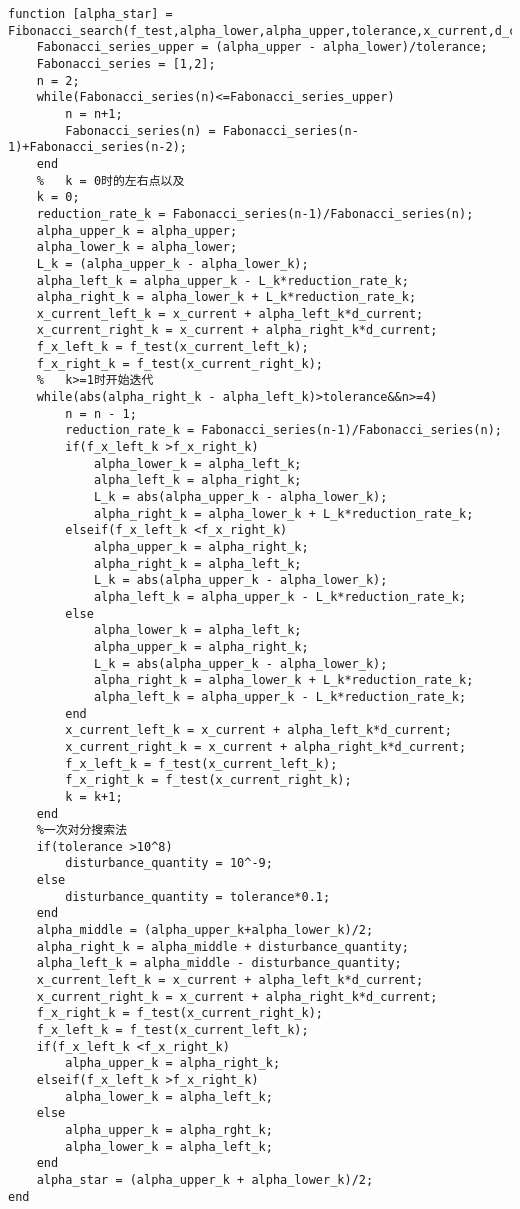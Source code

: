 \newpage
\begin{lstlisting}[style=matlab, title="斐波那契方法代码"]
function [alpha_star] = Fibonacci_search(f_test,alpha_lower,alpha_upper,tolerance,x_current,d_current)
    Fabonacci_series_upper = (alpha_upper - alpha_lower)/tolerance;
    Fabonacci_series = [1,2];
    n = 2;
    while(Fabonacci_series(n)<=Fabonacci_series_upper)
        n = n+1;
        Fabonacci_series(n) = Fabonacci_series(n-1)+Fabonacci_series(n-2);
    end
    %   k = 0时的左右点以及
    k = 0;
    reduction_rate_k = Fabonacci_series(n-1)/Fabonacci_series(n);
    alpha_upper_k = alpha_upper;
    alpha_lower_k = alpha_lower;
    L_k = (alpha_upper_k - alpha_lower_k);
    alpha_left_k = alpha_upper_k - L_k*reduction_rate_k;
    alpha_right_k = alpha_lower_k + L_k*reduction_rate_k;
    x_current_left_k = x_current + alpha_left_k*d_current;
    x_current_right_k = x_current + alpha_right_k*d_current;
    f_x_left_k = f_test(x_current_left_k);
    f_x_right_k = f_test(x_current_right_k);
    %   k>=1时开始迭代
    while(abs(alpha_right_k - alpha_left_k)>tolerance&&n>=4)
        n = n - 1;
        reduction_rate_k = Fabonacci_series(n-1)/Fabonacci_series(n);
        if(f_x_left_k >f_x_right_k)
            alpha_lower_k = alpha_left_k;
            alpha_left_k = alpha_right_k;
            L_k = abs(alpha_upper_k - alpha_lower_k);
            alpha_right_k = alpha_lower_k + L_k*reduction_rate_k;
        elseif(f_x_left_k <f_x_right_k)
            alpha_upper_k = alpha_right_k;
            alpha_right_k = alpha_left_k;
            L_k = abs(alpha_upper_k - alpha_lower_k);
            alpha_left_k = alpha_upper_k - L_k*reduction_rate_k;
        else
            alpha_lower_k = alpha_left_k;
            alpha_upper_k = alpha_right_k;
            L_k = abs(alpha_upper_k - alpha_lower_k);
            alpha_right_k = alpha_lower_k + L_k*reduction_rate_k;
            alpha_left_k = alpha_upper_k - L_k*reduction_rate_k;
        end
        x_current_left_k = x_current + alpha_left_k*d_current;
        x_current_right_k = x_current + alpha_right_k*d_current;
        f_x_left_k = f_test(x_current_left_k);
        f_x_right_k = f_test(x_current_right_k);
        k = k+1;
    end
    %一次对分搜索法
    if(tolerance >10^8)
        disturbance_quantity = 10^-9;
    else
        disturbance_quantity = tolerance*0.1;
    end
    alpha_middle = (alpha_upper_k+alpha_lower_k)/2;
    alpha_right_k = alpha_middle + disturbance_quantity;
    alpha_left_k = alpha_middle - disturbance_quantity;
    x_current_left_k = x_current + alpha_left_k*d_current;
    x_current_right_k = x_current + alpha_right_k*d_current;
    f_x_right_k = f_test(x_current_right_k);
    f_x_left_k = f_test(x_current_left_k);
    if(f_x_left_k <f_x_right_k)
        alpha_upper_k = alpha_right_k;
    elseif(f_x_left_k >f_x_right_k)
        alpha_lower_k = alpha_left_k;
    else
        alpha_upper_k = alpha_rght_k;
        alpha_lower_k = alpha_left_k;
    end
    alpha_star = (alpha_upper_k + alpha_lower_k)/2;
end
\end{lstlisting}

